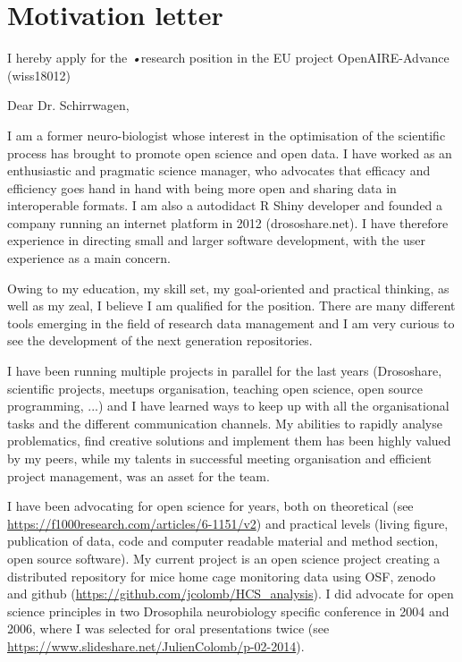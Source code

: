 \section* {Motivation letter}

I hereby apply for the \textsl{•}research position in the EU project OpenAIRE-Advance (wiss18012)
\vspace {0.1cm} 

Dear Dr. Schirrwagen,

I am a former neuro-biologist whose interest in the optimisation of the scientific process has brought to promote open science and open data. I have worked as an enthusiastic and pragmatic science manager, who advocates that efficacy and efficiency goes hand in hand with being more open and sharing data in interoperable formats. I am also a autodidact R Shiny developer and founded a company running an internet platform in 2012 (drososhare.net). I have therefore experience in directing small and larger software development, with the user experience as a main concern.

Owing to my education, my skill set, my goal-oriented and practical thinking, as well as my zeal, I believe I am qualified for the position. There are many different tools emerging in the field of research data management and I am very curious to see the development of the next generation repositories.

I have been running multiple projects in parallel for the last years (Drososhare, scientific projects, meetups organisation, teaching open science, open source programming, ...) and I have learned ways to keep up with all the organisational tasks and the different communication channels.
 My abilities to rapidly analyse problematics, find creative solutions and implement them has been highly valued by my peers, while my talents in successful meeting organisation and  efficient project management, was an asset for the team. 


I have been advocating for open science for years, both on theoretical (see \url{https://f1000research.com/articles/6-1151/v2}) and  practical levels (living figure, publication of data, code and computer readable material and method section, open source software). My current project is an open science project creating a distributed repository for mice home cage monitoring data using OSF, zenodo and github (\url{https://github.com/jcolomb/HCS_analysis}). I did advocate for open science principles in two Drosophila neurobiology specific conference in 2004 and 2006, where I was selected for oral presentations twice (see \url{https://www.slideshare.net/JulienColomb/p-02-2014}).


